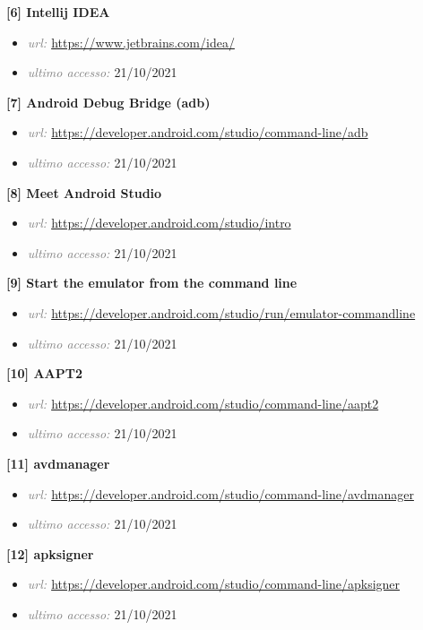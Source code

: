 \bigskip
\textbf{[6] Intellij IDEA}
\begin{itemize}[nosep]
\item[] \emph{\textcolor{gray}{url: }} \url{https://www.jetbrains.com/idea/}
\item[] \emph{\textcolor{gray}{ultimo accesso: }} 21/10/2021
\end{itemize}
\bigskip
\textbf{[7] Android Debug Bridge (adb)}
\begin{itemize}[nosep]
\item[] \emph{\textcolor{gray}{url: }} \url{https://developer.android.com/studio/command-line/adb}
\item[] \emph{\textcolor{gray}{ultimo accesso: }} 21/10/2021
\end{itemize}
\bigskip
\textbf{[8] Meet Android Studio}
\begin{itemize}[nosep]
\item[] \emph{\textcolor{gray}{url: }} \url{https://developer.android.com/studio/intro}
\item[] \emph{\textcolor{gray}{ultimo accesso: }} 21/10/2021
\end{itemize}
\bigskip
\textbf{[9] Start the emulator from the command line}
\begin{itemize}[nosep]
\item[] \emph{\textcolor{gray}{url: }} \url{https://developer.android.com/studio/run/emulator-commandline}
\item[] \emph{\textcolor{gray}{ultimo accesso: }} 21/10/2021
\end{itemize}
\bigskip
\textbf{[10] AAPT2}
\begin{itemize}[nosep]
\item[] \emph{\textcolor{gray}{url: }} \url{https://developer.android.com/studio/command-line/aapt2}
\item[] \emph{\textcolor{gray}{ultimo accesso: }} 21/10/2021
\end{itemize}
\bigskip
\textbf{[11] avdmanager}
\begin{itemize}[nosep]
\item[] \emph{\textcolor{gray}{url: }} \url{https://developer.android.com/studio/command-line/avdmanager}
\item[] \emph{\textcolor{gray}{ultimo accesso: }} 21/10/2021
\end{itemize}
\bigskip
\textbf{[12] apksigner}
\begin{itemize}[nosep]
\item[] \emph{\textcolor{gray}{url: }} \url{https://developer.android.com/studio/command-line/apksigner}
\item[] \emph{\textcolor{gray}{ultimo accesso: }} 21/10/2021
\end{itemize}
